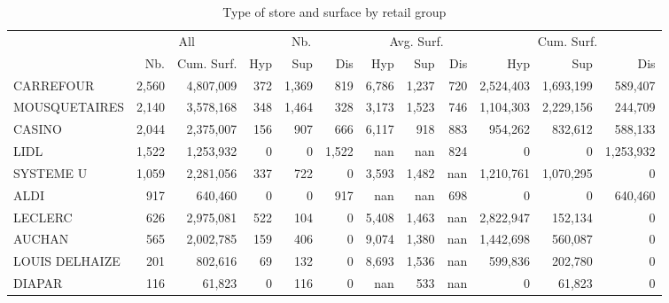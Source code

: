 \documentclass[11pt]{article}
\begin{document}
\begin{table}[H]
\caption{Type of store and surface by retail group}
\footnotesize
\setlength{\tabcolsep}{2pt}

\begin{tabular}{l|rr|rrr|rrr|rrr}
\toprule
{} & \multicolumn{2}{c|}{All} &   \multicolumn{3}{c|}{Nb.}   &   \multicolumn{3}{c|}{Avg. Surf.}   &   \multicolumn{3}{c}{Cum. Surf.} \\ 
{} &        Nb. &  Cum. Surf. &        Hyp &        Sup &      Dis &        Hyp &        Sup &      Dis &        Hyp &        Sup &      Dis \\
\midrule
CARREFOUR      &      2,560 &   4,807,009 &        372 &      1,369 &        819 &      6,786 &      1,237 &        720 &  2,524,403 &  1,693,199 &    589,407 \\
MOUSQUETAIRES  &      2,140 &   3,578,168 &        348 &      1,464 &        328 &      3,173 &      1,523 &        746 &  1,104,303 &  2,229,156 &    244,709 \\
CASINO         &      2,044 &   2,375,007 &        156 &        907 &        666 &      6,117 &        918 &        883 &    954,262 &    832,612 &    588,133 \\
LIDL           &      1,522 &   1,253,932 &          0 &          0 &      1,522 &        nan &        nan &        824 &          0 &          0 &  1,253,932 \\
SYSTEME U      &      1,059 &   2,281,056 &        337 &        722 &          0 &      3,593 &      1,482 &        nan &  1,210,761 &  1,070,295 &          0 \\
ALDI           &        917 &     640,460 &          0 &          0 &        917 &        nan &        nan &        698 &          0 &          0 &    640,460 \\
LECLERC        &        626 &   2,975,081 &        522 &        104 &          0 &      5,408 &      1,463 &        nan &  2,822,947 &    152,134 &          0 \\
AUCHAN         &        565 &   2,002,785 &        159 &        406 &          0 &      9,074 &      1,380 &        nan &  1,442,698 &    560,087 &          0 \\
LOUIS DELHAIZE &        201 &     802,616 &         69 &        132 &          0 &      8,693 &      1,536 &        nan &    599,836 &    202,780 &          0 \\
DIAPAR         &        116 &      61,823 &          0 &        116 &          0 &        nan &        533 &        nan &          0 &     61,823 &          0 \\

\end{tabular}
\end{table}
\end{document}

